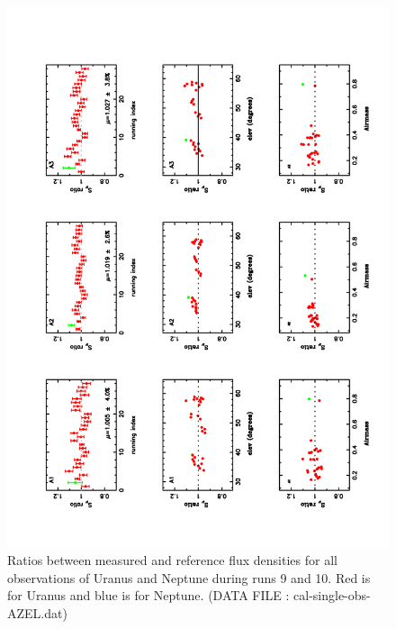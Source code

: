 \begin{figure}
\begin{center}
  \includegraphics[clip, angle=-90, scale=0.6]{Figures/Ura_Nep_ratio_index_elev_airmass.pdf}
  \caption{Ratios between measured and reference flux densities for all observations of Uranus and Neptune during runs 9 and 10.
    Red is for Uranus and blue is for Neptune.  (DATA FILE : cal-single-obs-AZEL.dat)}
\label{fig:U_N_ratio}
\end{center}
\end{figure}

